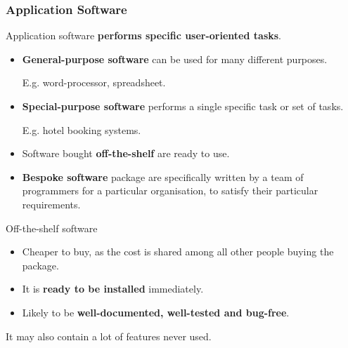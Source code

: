 \subsubsection*{Application Software}

Application software \textbf{performs specific user-oriented tasks}.
\begin{itemize}
    \item \textbf{General-purpose software} can be used for many different purposes.

        E.g. word-processor, spreadsheet.
    \item \textbf{Special-purpose software} performs a single specific task or set of tasks.

        E.g. hotel booking systems.

    \item Software bought \textbf{off-the-shelf} are ready to use.
    \item \textbf{Bespoke software} package are specifically written by a team of programmers for a particular organisation, to satisfy their particular requirements.
\end{itemize}

Off-the-shelf software
\begin{itemize}
    \item Cheaper to buy, as the cost is shared among all other people buying the package.
    \item It is \textbf{ready to be installed} immediately.
    \item Likely to be \textbf{well-documented, well-tested and bug-free}.
\end{itemize}
It may also contain a lot of features never used.
